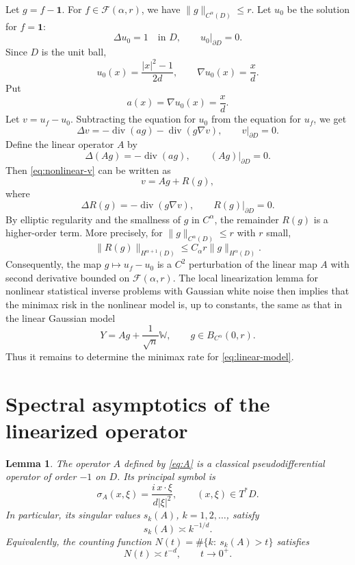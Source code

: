 \documentclass[11pt]{article}
\newcommand{\one}{\mathbf{1}}
\newtheorem{lemma}[theorem]{Lemma}
\theoremstyle{remark}
\begin{document}
Let \(g=f-\one\). For \(f\in\mathcal F(\alpha,r)\), we have \(\|g\|_{C^\alpha(D)}\le r\). Let \(u_0\) be the solution for \(f=\one\):
\[
\Delta u_0=1\quad\text{in }D,\qquad u_0|_{\partial D}=0.
\]
Since \(D\) is the unit ball,
\[
u_0(x)=\frac{|x|^2-1}{2d},\qquad \nabla u_0(x)=\frac{x}{d}.
\]
Put
\[
a(x)=\nabla u_0(x)=\frac{x}{d}.
\]
Let \(v=u_f-u_0\). Subtracting the equation for \(u_0\) from the equation for \(u_f\), we get
\begin{equation}\label{eq:nonlinear-v}
\Delta v=-\operatorname{div}(a g)-\operatorname{div}(g\nabla v),\qquad v|_{\partial D}=0.
\end{equation}
Define the linear operator \(A\) by
\begin{equation}\label{eq:A}
\Delta(A g)=-\operatorname{div}(a g),\qquad (A g)|_{\partial D}=0.
\end{equation}
Then \eqref{eq:nonlinear-v} can be written as
\[
v=A g+R(g),
\]
where
\[
\Delta R(g)=-\operatorname{div}(g\nabla v),\qquad R(g)|_{\partial D}=0.
\]
By elliptic regularity and the smallness of \(g\) in \(C^\alpha\), the remainder \(R(g)\) is a higher-order term. More precisely, for \(\|g\|_{C^\alpha(D)}\le r\) with \(r\) small,
\[
\|R(g)\|_{H^{\alpha+1}(D)}
\le C_\alpha r\|g\|_{H^\alpha(D)}.
\]
Consequently, the map \(g\mapsto u_f-u_0\) is a \(C^2\) perturbation of the linear map \(A\) with second derivative bounded on \(\mathcal F(\alpha,r)\). The local linearization lemma for nonlinear statistical inverse problems with Gaussian white noise \cite[Lemma 2.3]{nickl2019} then implies that the minimax risk in the nonlinear model is, up to constants, the same as that in the linear Gaussian model
\begin{equation}\label{eq:linear-model}
Y=A g+\frac1{\sqrt n}\mathbb W,\qquad g\in B_{C^\alpha}(0,r).
\end{equation}
Thus it remains to determine the minimax rate for \eqref{eq:linear-model}.

\section{Spectral asymptotics of the linearized operator}

\begin{lemma}\label{lem:spectral}
The operator \(A\) defined by \eqref{eq:A} is a classical pseudodifferential operator of order \(-1\) on \(D\). Its principal symbol is
\[
\sigma_A(x,\xi)=\frac{i\,x\cdot\xi}{d|\xi|^2},\qquad (x,\xi)\in T^*D.
\]
In particular, its singular values \(s_k(A)\), \(k=1,2,\dots\), satisfy
\[
s_k(A)\asymp k^{-1/d}.
\]
Equivalently, the counting function \(N(t)=\#\{k:\ s_k(A)>t\}\) satisfies
\[
N(t)\asymp t^{-d},\qquad t\to0^+.
\]
\end{lemma}
\end{document}
